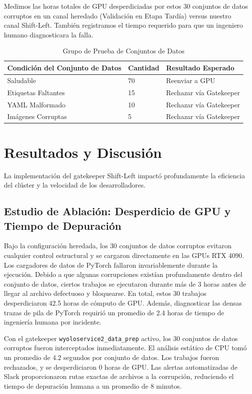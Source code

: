 \documentclass[11pt,a4paper]{article}
\begin{document}
Medimos las horas totales de GPU desperdiciadas por estos 30 conjuntos de datos corruptos en un canal heredado (Validación en Etapa Tardía) versus nuestro canal Shift-Left. También registramos el tiempo requerido para que un ingeniero humano diagnosticara la falla.

\begin{table}[htbp]
\centering
\caption{Grupo de Prueba de Conjuntos de Datos}
\label{tab:datasets}
\begin{tabular}{@{}lll@{}}
\toprule
Condición del Conjunto de Datos & Cantidad & Resultado Esperado \\ \midrule
Saludable & 70 & Reenviar a GPU \\
Etiquetas Faltantes & 15 & Rechazar vía Gatekeeper \\
YAML Malformado & 10 & Rechazar vía Gatekeeper \\
Imágenes Corruptas & 5 & Rechazar vía Gatekeeper \\ \bottomrule
\end{tabular}
\end{table}

\section{Resultados y Discusión}
La implementación del gatekeeper Shift-Left impactó profundamente la eficiencia del clúster y la velocidad de los desarrolladores.

\subsection{Estudio de Ablación: Desperdicio de GPU y Tiempo de Depuración}
Bajo la configuración heredada, los 30 conjuntos de datos corruptos evitaron cualquier control estructural y se cargaron directamente en las GPUs RTX 4090. Los cargadores de datos de PyTorch fallaron invariablemente durante la ejecución. Debido a que algunas corrupciones existían profundamente dentro del conjunto de datos, ciertos trabajos se ejecutaron durante más de 3 horas antes de llegar al archivo defectuoso y bloquearse. En total, estos 30 trabajos desperdiciaron 42.5 horas de cómputo de GPU. Además, diagnosticar las densas trazas de pila de PyTorch requirió un promedio de 2.4 horas de tiempo de ingeniería humana por incidente.

Con el gatekeeper \texttt{wyoloservice2\_data\_prep} activo, los 30 conjuntos de datos corruptos fueron interceptados inmediatamente. El análisis estático de CPU tomó un promedio de 4.2 segundos por conjunto de datos. Los trabajos fueron rechazados, y se desperdiciaron 0 horas de GPU. Las alertas automatizadas de Slack proporcionaron rutas exactas de archivos a la corrupción, reduciendo el tiempo de depuración humana a un promedio de 8 minutos.
\end{document}
